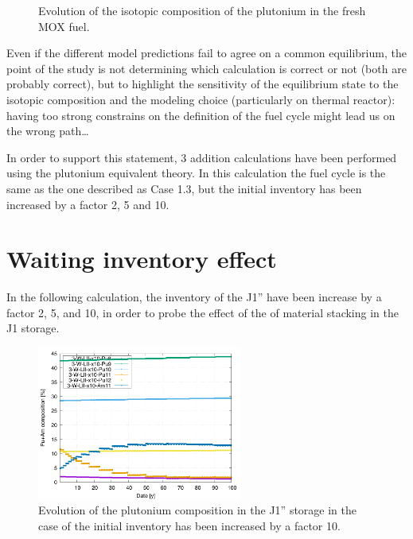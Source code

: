 \documentclass[10pt]{article}
\begin{document}
\begin{figure}[h!]
  \centering
  

  \caption{ Evolution of the isotopic composition of the plutonium in the fresh MOX fuel.
    \label{fig:pu_compo} } 
  \end{figure}

Even if the different model predictions fail to agree on a common equilibrium,
the point of the study is not determining which calculation is correct or not
(both are probably correct), but to highlight the sensitivity of the equilibrium
state to the isotopic composition and the modeling choice (particularly on
thermal reactor): having too strong constrains on the definition of the fuel
cycle might lead us on the wrong path\dots


In order to support this statement, 3 addition calculations have been performed
using the plutonium equivalent theory. In this calculation the fuel cycle is
the same as the one described as Case 1.3, but the initial inventory has been
increased by a factor 2, 5 and 10.


\section{Waiting inventory effect}

In the following calculation, the inventory of the J1'' have been increase by a
factor 2, 5, and 10, in order to probe the effect of the of material stacking in
the J1 storage.

\begin{figure}[h!]
  \centering
  \includegraphics[width=0.6\textwidth]  {img/C_1_3_W_LII_x10_pu_composition}
  \caption{Evolution of the plutonium composition in the J1'' storage in the
  case of the initial inventory has been increased by a factor 10.}
  \label{fig:LII_compo_x10}
\end{figure}
\end{document}
